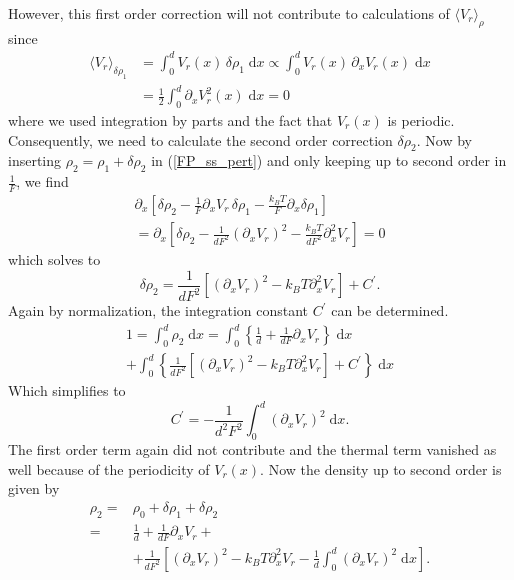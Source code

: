 \documentclass[aps,pre,twocolumn,showpacs,showkeys]{revtex4-1}
\newcommand{\rmd}{{\mathrm d}}
\begin{document}
However, this first order correction will not contribute to calculations of $\langle V_r \rangle_\rho$ since
\begin{align*}
\langle V_r \rangle_{\delta\rho_1} 
&= \int_0^d V_r(x) \, \delta\rho_1 \; \rmd x
\propto \int_0^d V_r(x) \, \partial_x V_r(x) \; \rmd x \\
&= \frac{1}{2} \int_0^d \partial_x V_r^2(x) \; \rmd x 
= 0
\end{align*}
where we used integration by parts and the fact that $V_r(x)$ is periodic.
Consequently, we need to calculate the second order correction $\delta\rho_2$. 
Now by inserting $\rho_2 = \rho_1 + \delta\rho_2$ in (\ref{FP_ss_pert}) and only keeping up to second order in $\frac{1}{F}$, we find
\begin{multline*}
\partial_x \left[ \delta\rho_2 - \frac{1}{F} \partial_x V_r \, \delta\rho_1 - \frac{k_B T}{F} \partial_x \delta\rho_1 \right] \\
= \partial_x \left[ \delta\rho_2 - \frac{1}{ d F^2 } \left(\partial_x V_r\right)^2 - \frac{k_B T}{dF^2} \partial_x^2 V_r \right] 
= 0
\end{multline*}
which solves to
\begin{equation*}
\delta\rho_2 = \frac{1}{ d F^2} \left[ \left( \partial_x V_r \right)^2 - k_B T \partial_x^2 V_r \right] + C^\prime.
\end{equation*}
Again by normalization, the integration constant $C^\prime$ can be determined.
\begin{multline*}
1 = \int_0^d \rho_2 \; \rmd x 
= \int_0^d \left\{ \frac{1}{d} + \frac{1}{ d F } \partial_x V_r \right\} \; \rmd x \\
+ \int_0^d \left\{  \frac{1}{ d F^2 } \left[ \left( \partial_x V_r \right)^2 - k_B T \partial_x^2 V_r \right] + C^\prime\right\} \; \rmd x 
\end{multline*}
Which simplifies to
\begin{equation}
C^\prime = - \frac{1}{ d^2 F^2 } \int_0^d \left( \partial_x V_r \right)^2 \; \rmd x . 
\end{equation}
The first order term again did not contribute and the thermal term vanished as well because of the periodicity of $V_r(x)$. 
Now the density up to second order is given by
\begin{align*}
\rho_2 =& \rho_0 + \delta\rho_1 + \delta\rho_2 \\
=& \frac{1}{d} + \frac{1}{d F} \partial_x V_r +{} \\
&+ \frac{1}{d F^2} \left[ \left( \partial_x V_r \right)^2 - k_B T \partial_x^2V_r - \frac{1}{d} \int_0^d \left( \partial_x V_r \right)^2 \; \rmd x \right] .
\end{align*}
\end{document}

